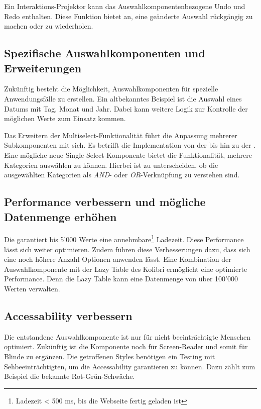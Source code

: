 Ein Interaktions-Projektor kann das Auswahlkomponentenbezogene Undo und Redo enthalten. 
Diese Funktion bietet an, eine geänderte Auswahl rückgängig zu machen oder zu wiederholen. 


\subsection{Spezifische Auswahlkomponenten und Erweiterungen}
\label{sec:specificComponents}

Zukünftig besteht die Möglichkeit, Auswahlkomponenten für spezielle Anwendungsfälle zu erstellen. 
Ein altbekanntes Beispiel ist die Auswahl eines Datums mit Tag, Monat und Jahr. 
Dabei kann weitere Logik zur Kontrolle der möglichen Werte zum Einsatz kommen. 

Das Erweitern der Multiselect-Funktionalität führt die Anpassung mehrerer Subkomponenten mit sich. 
Es betrifft die Implementation von der  bis hin zu der . 
Eine mögliche neue Single-Select-Komponente bietet die Funktionalität, mehrere Kategorien auswählen zu können. 
Hierbei ist zu unterscheiden, ob die ausgewählten Kategorien als \emph{AND}- oder \emph{OR}-Verknüpfung zu verstehen sind. 


\subsection{Performance verbessern und mögliche Datenmenge erhöhen}
\label{sec:betterPerformance}

Die  garantiert bis 5'000 Werte eine annehmbare\footnote{
    Ladezeit < 500 ms, bis die Webseite fertig geladen ist
} Ladezeit. 
Diese Performance lässt sich weiter optimieren. 
Zudem führen diese Verbesserungen dazu, dass sich eine noch höhere Anzahl Optionen anwenden lässt. 
Eine Kombination der Auswahlkomponente mit der Lazy Table des Kolibri ermöglicht eine optimierte Performance. 
Denn die Lazy Table kann eine Datenmenge von über 100'000 Werten verwalten. 


\subsection{Accessability verbessern}
\label{sec:betterAccessability}

Die entstandene Auswahlkomponente ist nur für nicht beeinträchtigte Menschen optimiert. 
Zukünftig ist die Komponente noch für Screen-Reader und somit für Blinde zu ergänzen. 
Die getroffenen Styles benötigen ein Testing mit Sehbeeinträchtigten, um die Accessability garantieren zu können. 
Dazu zählt zum Beispiel die bekannte Rot-Grün-Schwäche. 


